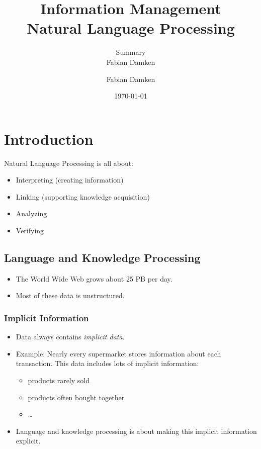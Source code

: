 \documentclass[a4paper, 11pt, accentcolor = tud3b]{tudreport}
\title{Information Management \\ Natural Language Processing}
\subtitle{Summary \\ Fabian Damken}
\author{Fabian Damken}
\date{\today}
\begin{document}
    \maketitle
    \tableofcontents
    \listoftodos

    \chapter{Introduction} %
    	Natural Language Processing is all about:
    	\begin{itemize}
    		\item Interpreting (creating information)
    		\item Linking (supporting knowledge acquisition)
    		\item Analyzing
    		\item Verifying
    	\end{itemize}

        \section{Language and Knowledge Processing} %
        	\begin{itemize}
        		\item The World Wide Web grows about 25 PB per day.
        		\item Most of these data is unstructured.
        	\end{itemize}

            \subsection{Implicit Information} %
                \begin{itemize}
                	\item Data always contains \textit{implicit data}.
                	\item Example: Nearly every supermarket stores information about each transaction. This data includes lots of implicit information:
                		\begin{itemize}
                			\item products rarely sold
                			\item products often bought together
                			\item \dots
                		\end{itemize}
                	\item Language and knowledge processing is about making this implicit information explicit.
                \end{itemize}
\end{document}
